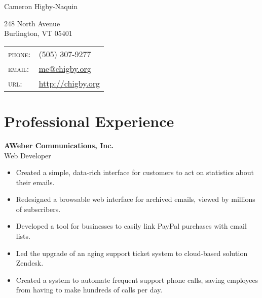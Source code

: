 \documentclass[10pt, a4paper]{article}
\newcommand{\years}[1]{\marginnote{\scriptsize #1}}
\begin{document}
{\LARGE Cameron Higby-Naquin}\\
\begin{multicols}{2}
248 North Avenue\\
Burlington, VT 05401
\vfill
\columnbreak
\begin{tabular}{ll}
\textsc{phone}:&(505) 307-9277\\ %
\textsc{email}:&\href{mailto:me@chigby.org}{me@chigby.org}\\
\textsc{url}:&\href{http://chigby.org/}{http://chigby.org}\\
\end{tabular}
\end{multicols}

\section*{Professional Experience}
\noindent
\years{2009-2012}\textbf{AWeber Communications, Inc.}\\
Web Developer
\begin{itemize}
\item Created a simple, data-rich interface for customers to act on statistics about their emails.
\item Redesigned a browsable web interface for archived emails, viewed by millions of subscribers.
\item Developed a tool for businesses to easily link PayPal purchases with email lists. %
\item Led the upgrade of an aging support ticket system to cloud-based solution Zendesk.
\item Created a system to automate frequent support phone calls, saving employees from having to make hundreds of calls per day.
\end{itemize}
\end{document}
